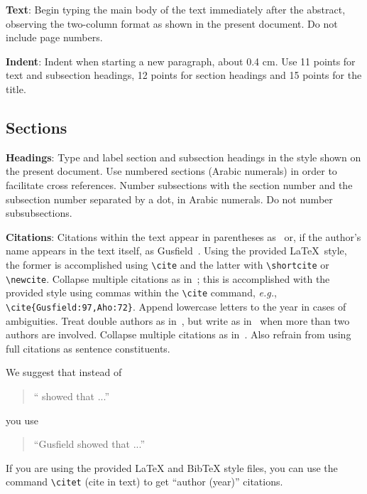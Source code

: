 {\bf Text}: Begin typing the main body of the text immediately after the abstract, observing the two-column format as shown in the present document. Do not include page numbers.

{\bf Indent}: Indent when starting a new paragraph, about 0.4 cm. Use 11 points for text and subsection headings, 12 points for section headings and 15 points for the title. 

\subsection{Sections}

{\bf Headings}: Type and label section and subsection headings in the style shown on the present document.  Use numbered sections (Arabic numerals) in order to facilitate cross references. Number subsections with the section number and the subsection number separated by a dot, in Arabic numerals. Do not number subsubsections.

{\bf Citations}: Citations within the text appear in parentheses as~\cite{Gusfield:97} or, if the author's name appears in the text itself, as Gusfield~.
Using the provided \LaTeX\ style, the former is accomplished using
{\small\verb|\cite|} and the latter with {\small\verb|\shortcite|} or {\small\verb|\newcite|}. Collapse multiple citations as in~\cite{Gusfield:97,Aho:72}; this is accomplished with the provided style using commas within the {\small\verb|\cite|} command, {\em e.g.}, {\small\verb|\cite{Gusfield:97,Aho:72}|}. Append lowercase letters to the year in cases of ambiguities. Treat double authors as in~\cite{Aho:72}, but write as in~\cite{Chandra:81} when more than two authors are involved. Collapse multiple citations as in~\cite{Gusfield:97,Aho:72}. Also refrain from using full citations as sentence constituents.

We suggest that instead of

\begin{quote}
  ``\cite{Gusfield:97} showed that ...''
\end{quote}

you use

\begin{quote}
``Gusfield    showed that ...''
\end{quote}

If you are using the provided \LaTeX{} and Bib\TeX{} style files, you can use the command \verb|\citet| (cite in text) to get ``author (year)'' citations.

